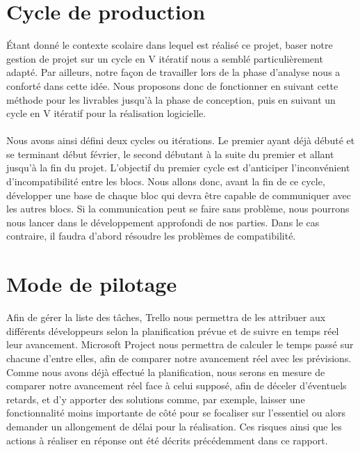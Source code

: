 \section{Cycle de production}

Étant donné le contexte scolaire dans lequel est réalisé ce projet, baser notre gestion de projet sur un cycle en V itératif nous a semblé particulièrement adapté. Par ailleurs, notre
façon de travailler lors de la phase d’analyse nous a conforté dans cette idée. Nous proposons donc de fonctionner en suivant cette méthode pour les livrables jusqu’à la phase de conception, puis en suivant un cycle en V itératif pour la réalisation logicielle. 

\paragraph{}

Nous avons ainsi défini deux cycles ou itérations. Le premier ayant déjà débuté et se terminant début février, le second débutant à la suite du premier et allant jusqu’à la fin du projet. L’objectif du premier cycle est d’anticiper l’inconvénient d’incompatibilité entre les blocs. Nous allons donc, avant la fin de ce cycle, développer une base de chaque bloc qui devra être capable de communiquer avec les autres blocs. Si la communication peut se faire sans problème, nous pourrons nous lancer dans le développement approfondi de nos parties. Dans le cas contraire, il faudra d’abord résoudre les problèmes de compatibilité.

\newpage

\section{Mode de pilotage}

Afin de gérer la liste des tâches, Trello nous permettra de les attribuer aux différents développeurs selon la planification prévue et de suivre en temps réel leur avancement. Microsoft Project nous permettra de calculer le temps passé sur chacune d’entre elles, afin de comparer notre avancement réel avec les prévisions. Comme nous avons déjà effectué la planification, nous serons en mesure de comparer notre avancement réel face à celui supposé, afin de déceler d’éventuels retards, et d’y apporter des solutions comme, par exemple, laisser une fonctionnalité moins importante de côté pour se focaliser sur l’essentiel ou alors demander un allongement de délai pour la réalisation. Ces risques ainsi que les actions à réaliser en réponse ont été décrits précédemment dans ce rapport.

